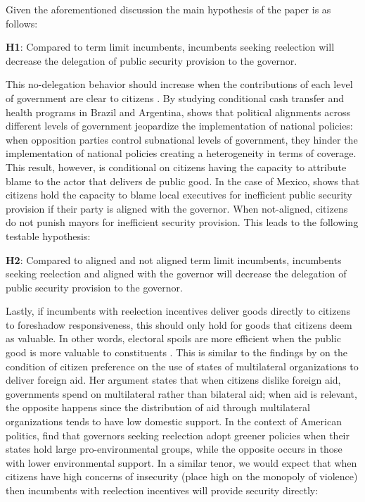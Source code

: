 \documentclass[12pt]{amsart}
\numberwithin{equation}{section}
\theoremstyle{definition}
\theoremstyle{definition}
\theoremstyle{definition}
\begin{document}
Given the aforementioned discussion the main hypothesis of the paper is as follows:
\bigskip

\textbf{H1}: Compared to term limit incumbents, incumbents seeking reelection will decrease the delegation of public security provision to the governor. 
\bigskip

This no-delegation behavior should increase when the contributions of each level of government are clear to citizens \citep{treisman_2000}. By studying conditional cash transfer and health programs in Brazil and Argentina, \citet{niedzwiecki_2018} shows that political alignments across different levels of government jeopardize the implementation of national policies: when opposition parties control subnational levels of government, they hinder the implementation of national policies creating a heterogeneity in terms of coverage. This result, however, is conditional on citizens having the capacity to attribute blame to the actor that delivers de public good. In the case of Mexico, \citet{ley_2017} shows that citizens hold the capacity to blame local executives for inefficient public security provision if their party is aligned with the governor. When not-aligned, citizens do not punish mayors for inefficient security provision. This leads to the following testable hypothesis: 

\bigskip

\textbf{H2}: Compared to aligned and not aligned term limit incumbents, incumbents seeking reelection and aligned with the governor will decrease the delegation of public security provision to the governor.
\bigskip

Lastly, if incumbents with reelection incentives deliver goods directly to citizens to foreshadow responsiveness, this should only hold for goods that citizens deem as valuable. In other words, electoral spoils are more efficient when the public good is more valuable to constituents \citep{lizzeri_2001}. This is similar to the findings by \citet{milner_2004} on the condition of citizen preference on the use of states of multilateral organizations to deliver foreign aid.  Her argument states that when citizens dislike foreign aid, governments spend on multilateral rather than bilateral aid; when aid is relevant, the opposite happens since the distribution of aid through multilateral organizations tends to have low domestic support. In the context of American politics, \citet{list_sturm_2006} find that governors seeking reelection adopt greener policies when their states hold large pro-environmental groups, while the opposite occurs in those with lower environmental support. In a similar tenor, we would expect that when citizens have high concerns of insecurity (place high on the monopoly of violence) then incumbents with reelection incentives will provide security directly:
\end{document}
